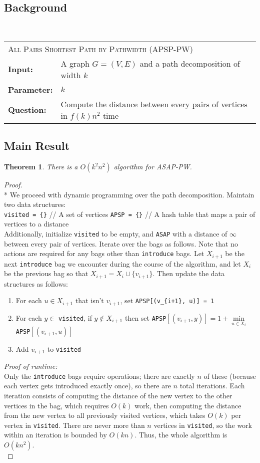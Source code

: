 \documentclass{article}
\newcommand{\problem}[1]{\textsc{#1}}
\newtheorem{theorem}{Theorem}
\newcommand{\defproblem}[4]{%
  \hfill\\\smallskip\noindent%
  \begin{tabularx}{\textwidth}{|l X|}%
    \hline%
    \multicolumn{2}{|l|}{\problem{#1}}\\%
    \textbf{Input:}&#2\\%
    \textbf{Parameter:}&#3\\%
    \textbf{Question:}&#4\smallskip\\\hline%
  \end{tabularx}%
  \smallskip%
}%
\newcommand{\proofnewline}{\mbox{}\\*}
\begin{document}
\subsection*{Background}
\defproblem{All Pairs Shortest Path by Pathwidth (APSP-PW)}
{A graph $G = (V,E)$ and a path decomposition of width $k$}
{$k$}
{Compute the distance between every pairs of vertices in $f(k) n^2$ time}

\subsection*{Main Result}
\begin{theorem}
There is a $O(k^2 n^2)$ algorithm for \textsc{ASAP-PW}.
\end{theorem}

\begin{proof}
\proofnewline
We proceed with dynamic programming over the path decomposition. Maintain two data structures:\\

\noindent \verb|visited = {}| // A set of vertices\newline
\noindent \verb|APSP = {}| // A hash table that maps a pair of vertices to a distance\\

\noindent Additionally, initialize \verb|visited| to be empty, and \verb|ASAP| with a distance of $\infty$ between every pair of vertices. Iterate over the bags as follows.
Note that no actions are required for any bags other than \texttt{introduce} bags. Let $X_{i+1}$ be the next \texttt{introduce} bag we encounter during the course of the algorithm, and let $X_i$ be the previous bag so that $X_{i+1} = X_i \cup \{v_{i+1}\}$.
Then update the data structures as follows:
\begin{enumerate}
\item For each $u \in X_{i+1}$ that isn't $v_{i+1}$, set \verb|APSP[(v_{i+1}, u)] = 1|
\item For each $y \in$ \verb|visited|, if $y \notin X_{i+1}$ then set \verb|APSP|$[(v_{i+1},y)] = 1 + \min\limits_{u \in X_i}$ \verb|APSP|$[(v_{i+1},u)]$
\item Add $v_{i+1}$ to \verb|visited|
\end{enumerate}

\noindent \emph{Proof of runtime:}\\
Only the \texttt{introduce} bags require operations; there are exactly $n$ of these (because each vertex gets introduced exactly once), so there are $n$ total iterations.
Each iteration consists of computing the distance of the new vertex to the other vertices in the bag, which requires $O(k)$ work, then computing the distance from the new vertex to all previously visited vertices, which takes $O(k)$ per vertex in \texttt{visited}.
There are never more than $n$ vertices in \texttt{visited}, so the work within an iteration is bounded by $O(kn)$.
Thus, the whole algorithm is $O(k n^2)$.\\


\end{proof}
\end{document}
